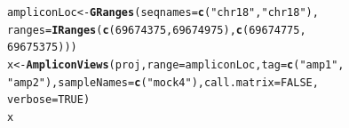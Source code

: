 \documentclass{article}\usepackage[]{graphicx}\usepackage[]{color}
\makeatletter
\newcommand{\hlnum}[1]{\textcolor[rgb]{0.686,0.059,0.569}{#1}}%
\newcommand{\hlstr}[1]{\textcolor[rgb]{0.192,0.494,0.8}{#1}}%
\newcommand{\hlstd}[1]{\textcolor[rgb]{0.345,0.345,0.345}{#1}}%
\newcommand{\hlkwb}[1]{\textcolor[rgb]{0.69,0.353,0.396}{#1}}%
\newcommand{\hlkwc}[1]{\textcolor[rgb]{0.333,0.667,0.333}{#1}}%
\newcommand{\hlkwd}[1]{\textcolor[rgb]{0.737,0.353,0.396}{\textbf{#1}}}%
\newenvironment{kframe}{%
 \def\at@end@of@kframe{}%
 \ifinner\ifhmode%
  \def\at@end@of@kframe{\end{minipage}}%
  \begin{minipage}{\columnwidth}%
 \fi\fi%
 \def\FrameCommand##1{\hskip\@totalleftmargin \hskip-\fboxsep
 \colorbox{shadecolor}{##1}\hskip-\fboxsep
     \hskip-\linewidth \hskip-\@totalleftmargin \hskip\columnwidth}%
 \MakeFramed {\advance\hsize-\width
   \@totalleftmargin\z@ \linewidth\hsize
   \@setminipage}}%
 {\par\unskip\endMakeFramed%
 \at@end@of@kframe}
\newenvironment{knitrout}{}{} %
\makeatother
\begin{document}
\begin{knitrout}
\color{fgcolor}\begin{kframe}
\begin{alltt}
\hlstd{ampliconLoc} \hlkwb{<-} \hlkwd{GRanges}\hlstd{(}\hlkwc{seqnames} \hlstd{=} \hlkwd{c}\hlstd{(}\hlstr{"chr18"}\hlstd{,} \hlstr{"chr18"}\hlstd{),}
    \hlkwc{ranges} \hlstd{=} \hlkwd{IRanges}\hlstd{(}\hlkwd{c}\hlstd{(}\hlnum{69674375}\hlstd{,} \hlnum{69674975}\hlstd{),} \hlkwd{c}\hlstd{(}\hlnum{69674775}\hlstd{,}
        \hlnum{69675375}\hlstd{)))}
\hlstd{x} \hlkwb{<-} \hlkwd{AmpliconViews}\hlstd{(proj,} \hlkwc{range} \hlstd{= ampliconLoc,} \hlkwc{tag} \hlstd{=} \hlkwd{c}\hlstd{(}\hlstr{"amp1"}\hlstd{,}
    \hlstr{"amp2"}\hlstd{),} \hlkwc{sampleNames} \hlstd{=} \hlkwd{c}\hlstd{(}\hlstr{"mock4"}\hlstd{),} \hlkwc{call.matrix} \hlstd{=} \hlnum{FALSE}\hlstd{,}
    \hlkwc{verbose} \hlstd{=} \hlnum{TRUE}\hlstd{)}
\hlstd{x}
\end{alltt}
\end{kframe}
\end{knitrout}
\end{document}

